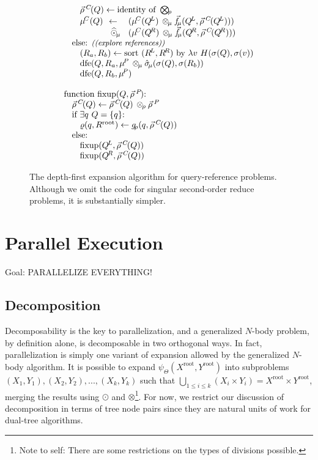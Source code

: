 \documentclass[times, leqno,twocolumn]{article}
\newcommand{\authornote}[1]{\footnote{Note to self: #1}}
\newcommand{\authorsnote}[1]{\authornote{#1}}
\newcommand{\com}[1]{{\small \textit{((#1))}}}
\newcommand{\Union}{\bigcup}
\newcommand{\summary}{\hat{\sigma}}
\newcommand{\gnp}{\psi_{\Theta}}
\newcommand{\psty}{}
\newcommand{\X}{\\ \psty}
\newcommand{\x}{\X \hspace{0.13in}}
\newcommand{\xx}{\X \hspace{0.26in}}
\newcommand{\kdroot}[1]{#1^{\text{root}}}
\newcommand{\kdleft}[1]{#1^{\!L}}
\newcommand{\kdright}[1]{#1^{\!R}}
\newcommand{\nameOp}[2]{\mathop{#1\nolimits\!\!_{#2}}}
\newcommand{\nameop}[2]{{\scriptstyle\:}#1_{\!#2}}
\newcommand{\myOp}[1]{\nameOp{\bigotimes}{#1}}
\newcommand{\myop}[1]{\nameop{\otimes}{#1}}
\newcommand{\letterqr}{\rho}
\newcommand{\outqr}{\varrho}
\newcommand{\Opqr}{\myOp{\letterqr}}
\newcommand{\opqr}{\myop{\letterqr}}
\newcommand{\gqr}{g_{\!\letterqr}}
\newcommand{\letterqrv}{\vec{\rho}}
\newcommand{\varqrv}{\letterqrv^{\:C\!}}
\newcommand{\varqrvparent}{\letterqrv^{\:P\!}}
\newcommand{\lettermu}{\mu}
\newcommand{\outopmu}{\:\widehat{\odot}_{\!\mu}\:}
\newcommand{\opmu}{\myop{\lettermu}}
\newcommand{\fmuv}{\vec{f_{\!\lettermu}}}
\newcommand{\deltamu}{\summary_{\!\lettermu}}
\newcommand{\heurqr}{H}
\newcommand{\varmuchild}{\lettermu^{\!C}}
\newcommand{\varmuparent}{\lettermu^{\!P}}
\newcommand{\outstat}{\sigma}
\begin{document}
\begin{figure}
\[\begin{array}[t]{l}
    \xx \varqrv(Q) \gets \text{identity of }\Opqr
    \xx \!\!\!\begin{array}{lll}
         \psty \varmuchild(Q) &\psty\!\!\gets\!\!&\psty (\varmuchild(\kdleft{Q})  \opmu \fmuv(\kdleft{Q}, \varqrv(\kdleft{Q})))
         \\          &\psty\!\!\outopmu\!\!&\psty (\varmuchild(\kdright{Q}) \opmu \fmuv(\kdright{Q}, \varqrv(\kdright{Q})))
        \end{array}
    \x \text{else: \com{explore references}}
    \xx (R_a, R_b) \gets \text{sort }(\kdleft{R}, \kdright{R})\text{ by }\lambda v ~ \heurqr(\sigma(Q), \sigma(v))
    \xx \text{dfe}(Q, R_a, \varmuparent \opmu \deltamu(\outstat(Q), \outstat(R_b))
    \xx \text{dfe}(Q, R_b, \varmuparent)
    \X
    \X \text{function fixup}(Q, \varqrvparent)\text{:}
    \x \varqrv(Q) \gets \varqrv(Q) \opqr \varqrvparent
    \x \text{if } \exists q ~ Q = \{q\}\text{:}
    \xx \outqr(q, \kdroot{R}) \gets \gqr(q, \varqrv(Q))
    \x \text{else:}
    \xx \text{fixup}(\kdleft{Q}, \varqrv(Q))
    \xx \text{fixup}(\kdright{Q}, \varqrv(Q))
  \end{array}
\]
\caption{\label{fig:dfe} The depth-first expansion algorithm for query-reference problems.
Although we omit the code for singular second-order reduce problems, it is substantially simpler.}
\end{figure}

\section{Parallel Execution}

Goal: PARALLELIZE EVERYTHING!

\subsection{Decomposition}

Decomposability is the key to parallelization, and a generalized $N$-body problem, by definition alone, is decomposable in two orthogonal ways.
In fact, parallelization is simply one variant of expansion allowed by the generalized $N$-body algorithm.
It is possible to expand $\gnp(\kdroot{X}, \kdroot{Y})$ into subproblems $(X_1,Y_1), (X_2,Y_2), ..., (X_k, Y_k)$ such that $\Union_{1 \leq i \leq k} (X_i \times Y_i) = \kdroot{X} \times \kdroot{Y}$, merging the results using $\odot$ and $\otimes$\authorsnote{There are some restrictions on the types of divisions possible.}.
For now, we restrict our discussion of decomposition in terms of tree node pairs since they are natural units of work for dual-tree algorithms.
\end{document}
